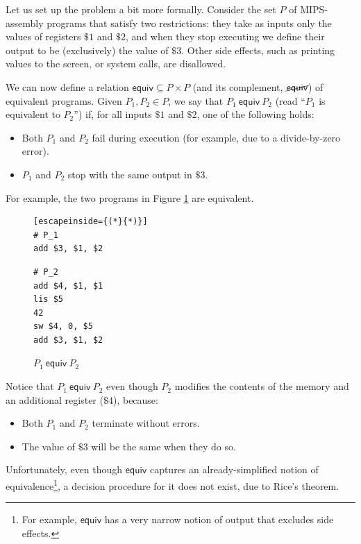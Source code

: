 \documentclass{llncs}
\newcommand{\erel}{\textsf{equiv}}
\newcommand{\pequiv}[2]{#1 \ \erel \ #2}
\begin{document}
Let us set up the problem a bit more formally. Consider the set $P$ of MIPS-assembly programs that satisfy two restrictions: they take as inputs only the values of registers $\$1$ and $\$2$, and when they stop executing we define their output to be (exclusively) the value of $\$3$. Other side effects, such as printing values to the screen, or system calls, are disallowed.

We can now define a relation $\erel \subseteq P \times P$ (and its complement, $\cancel{\erel}$) of equivalent programs. Given $P_1, P_2 \in P$, we say that $\pequiv{P_1}{P_2}$ (read ``$P_1$ is equivalent to $P_2$'') if, for all inputs $\$1$ and $\$2$, one of the following holds:
\begin{itemize}
\item Both $P_1$ and $P_2$ fail during execution (for example, due to a divide-by-zero error).
\item $P_1$ and $P_2$ stop with the same output in $\$3$. 
\end{itemize} 

For example, the two programs in Figure \ref{equivprogs} are equivalent.
 
\begin{figure}
\begin{multicols}{2}
\begin{lstlisting}[escapeinside={(*}{*)}]
# P_1
add $3, $1, $2
\end{lstlisting}
\vfill\null
\columnbreak
\begin{lstlisting}
# P_2
add $4, $1, $1
lis $5
42
sw $4, 0, $5
add $3, $1, $2
\end{lstlisting}
\end{multicols}
\caption{$\pequiv{P_1}{P_2}$}
\label{equivprogs}
\end{figure}

Notice that $\pequiv{P_1}{P_2}$ even though $P_2$ modifies the contents of the memory and an additional register ($\$4$), because:
\begin{itemize}
\item Both $P_1$ and $P_2$ terminate without errors.
\item The value of $\$3$ will be the same when they do so.
\end{itemize}

Unfortunately, even though $\erel$ captures an already-simplified notion of equivalence\footnote{For example, $\erel$ has a very narrow notion of output that excludes side effects.}, a decision procedure for it does not exist, due to Rice's theorem.
\end{document}
